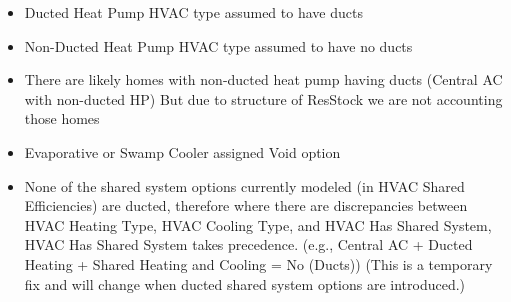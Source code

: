 \begin{itemize}
\item Ducted Heat Pump HVAC type assumed to have ducts
\item Non-Ducted Heat Pump HVAC type assumed to have no ducts
\item There are likely homes with non-ducted heat pump having ducts (Central AC with non-ducted HP) But due to structure of ResStock we are not accounting those homes
\item Evaporative or Swamp Cooler assigned Void option
\item None of the shared system options currently modeled (in HVAC Shared Efficiencies) are ducted, therefore where there are discrepancies between HVAC Heating Type, HVAC Cooling Type, and HVAC Has Shared System, HVAC Has Shared System takes precedence. (e.g., Central AC + Ducted Heating + Shared Heating and Cooling = No (Ducts)) (This is a temporary fix and will change when ducted shared system options are introduced.)
\end{itemize}
